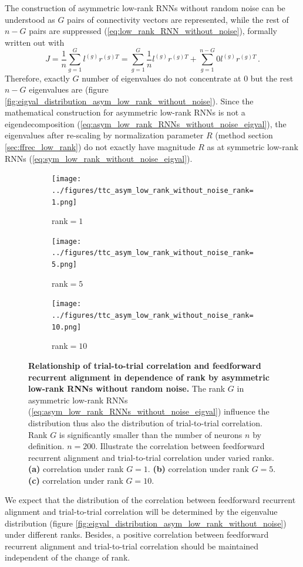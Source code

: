 \documentclass[11pt]{article}
\begin{document}
	The construction of asymmetric low-rank RNNs without random noise can be understood as $G$ pairs of connectivity vectors are represented, while the rest of $n-G$ pairs are suppressed (\ref{eq:low_rank_RNN_without_noise}), formally written out with
		\begin{equation} \label{eq:asym_low_rank_RNNs_without_noise_eigval}
			J = \frac{1}{n} \sum_{g=1}^{G} l^{(g)} r^{(g)T} = \sum_{g=1}^{G} \frac{1}{n} l^{(g)} r^{(g)T} + \sum_{g=1}^{n-G} 0 l^{(g)} r^{(g)T} \, .
		\end{equation}
	Therefore, exactly $G$ number of eigenvalues do not concentrate at $0$ but the rest $n-G$ eigenvalues are (figure \ref{fig:eigval_distribution_asym_low_rank_without_noise}). Since the mathematical construction for asymmetric low-rank RNNs is not a eigendecomposition (\ref{eq:asym_low_rank_RNNs_without_noise_eigval}), the eigenvalues after re-scaling by normalization parameter $R$ (method section \ref{sec:ffrec_low_rank}) do not exactly have magnitude $R$ as at symmetric low-rank RNNs (\ref{eq:sym_low_rank_without_noise_eigval}).	
	
		\begin{figure}[H]
			\centering
			\begin{subfigure}[b]{0.3\textwidth}
				\texttt{[image: ../figures/ttc\_asym\_low\_rank\_without\_noise\_rank=1.png]}
				\caption{rank$=1$}
			\end{subfigure}
			\begin{subfigure}[b]{0.3\textwidth}
				\texttt{[image: ../figures/ttc\_asym\_low\_rank\_without\_noise\_rank=5.png]}
				\caption{rank$=5$}
			\end{subfigure}
			\begin{subfigure}[b]{0.3\textwidth}
				\texttt{[image: ../figures/ttc\_asym\_low\_rank\_without\_noise\_rank=10.png]}
				\caption{rank$=10$}
			\end{subfigure} 
			\caption{\textbf{Relationship of trial-to-trial correlation and feedforward recurrent alignment in dependence of rank by asymmetric low-rank RNNs without random noise.} The rank $G$ in asymmetric low-rank RNNs (\ref{eq:asym_low_rank_RNNs_without_noise_eigval}) influence the distribution thus also the distribution of trial-to-trial correlation. Rank $G$ is significantly smaller than the number of neurons $n$ by definition. $n=200$. Illustrate the correlation between feedforward recurrent alignment and trial-to-trial correlation under varied ranks. \textbf{(a)} correlation under rank $G=1$. \textbf{(b)} correlation under rank $G=5$. \textbf{(c)} correlation under rank $G=10$.} 
			\label{fig:ttc_asym_low_rank_RNN_without_noise}
		\end{figure}
	We expect that the distribution of the correlation between feedforward recurrent alignment and trial-to-trial correlation will be determined by the eigenvalue distribution (figure \ref{fig:eigval_distribution_asym_low_rank_without_noise}) under different ranks. Besides, a positive correlation between feedforward recurrent alignment and trial-to-trial correlation should be maintained independent of the change of rank.
	
\end{document}
